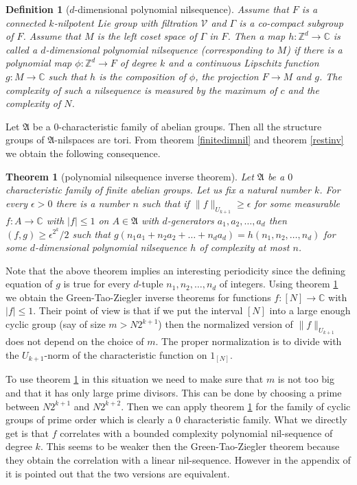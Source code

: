 \documentclass [11pt] {article}
\newtheorem{theorem}{Theorem}
\newtheorem{definition}{Definition}[section]
\begin{document}
\begin{definition}[$d$-dimensional polynomial nilsequence] Assume that $F$ is a connected $k$-nilpotent Lie group with filtration $\mathcal{V}$ and $\Gamma$ is a co-compact subgroup of $F$. Assume that $M$ is the left coset space of $\Gamma$ in $F$. Then a map $h:\mathbb{Z}^d\rightarrow\mathbb{C}$ is called a $d$-dimensional polynomial nilsequence (corresponding to $M$) if there is a polynomial map $\phi:\mathbb{Z}^d\rightarrow F$ of degree $k$ and a continuous Lipschitz function $g:M\rightarrow\mathbb{C}$ such that $h$ is the composition of $\phi$, the projection $F\rightarrow M$ and $g$. 
The complexity of such a nilsequence is measured by the maximum of $c$ and the complexity of $N$.
\end{definition}

Let $\mathfrak{A}$ be a $0$-characteristic family of abelian groups. Then all the structure groups of $\mathfrak{A}$-nilspaces are tori. From theorem \ref{finitedimnil} and theorem \ref{restinv} we obtain the following consequence.
\begin{theorem}[polynomial nilsequence inverse theorem]\label{PNIT} Let $\mathfrak{A}$ be a $0$ characteristic family of finite abelian groups. Let us fix a natural number $k$. For every $\epsilon>0$ there is a number $n$ such that if $\|f\|_{U_{k+1}}\geq\epsilon$ for some measurable $f:A\rightarrow\mathbb{C}$ with $|f|\leq 1$ on $A\in\mathfrak{A}$ with $d$-generators $a_1,a_2,\dots,a_d$ then $(f,g)\geq\epsilon^{2^k}/2$ such that $g(n_1a_1+n_2a_2+\dots+n_da_d)=h(n_1,n_2,\dots,n_d)$ for some $d$-dimensional polynomial nilsequence $h$ of complexity at most $n$.
\end{theorem}

Note that the above theorem implies an interesting periodicity since the defining equation of $g$ is true for every $d$-tuple $n_1,n_2,\dots,n_d$ of integers. 
Using theorem \ref{PNIT} we obtain the Green-Tao-Ziegler inverse theorems for functions $f:[N]\rightarrow\mathbb{C}$ with $|f|\leq 1$. Their point of view is that if we put the interval $[N]$ into a large enough cyclic group (say of size $m>N2^{k+1}$) then the normalized version of $\|f\|_{U_{k+1}}$ does not depend on the choice of $m$. The proper normalization is to divide with the $U_{k+1}$-norm of the characteristic function on $1_{[N]}$. 

To use theorem \ref{PNIT} in this situation we need to make sure that $m$ is not too big and that it has only large prime divisors. This can be done by choosing a prime between $N2^{k+1}$ and $N2^{k+2}$.
Then we can apply theorem \ref{PNIT} for the family of cyclic groups of prime order which is clearly a $0$ characteristic family.
What we directly get is that $f$ correlates with a bounded complexity polynomial nil-sequence of degree $k$.
This seems to be weaker then the Green-Tao-Ziegler theorem because they obtain the correlation with a linear nil-sequence. However in the appendix of \cite{GTZ} it is pointed out that the two versions are equivalent.
\end{document}
